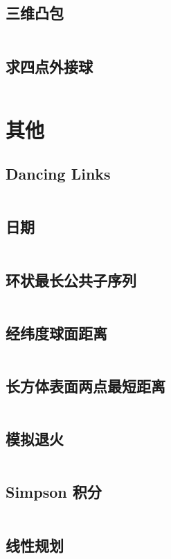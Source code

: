 \documentclass[a4paper,9]{article}
\begin{document}
\subsection{三维凸包}
\inputminted[breaklines,breakanywhere]{c++}{source/geometry/3d-convex.cpp}
\subsection{求四点外接球}
\inputminted[breaklines]{c++}{source/geometry/ball.cpp}

\section{其他}
\subsection{Dancing Links}
\inputminted[breaklines]{c++}{source/others/dancing-links.cpp}
\subsection{日期}
\inputminted[breaklines]{c++}{source/others/date.cpp}
\subsection{环状最长公共子序列}
\inputminted[breaklines]{c++}{source/others/cycle-longest.cpp}
\subsection{经纬度球面距离}
\inputminted[breaklines]{c++}{source/others/sphere.cpp}
\subsection{长方体表面两点最短距离}
\inputminted[breaklines]{c++}{source/others/rectangle.cpp}
\subsection{模拟退火}
\inputminted[breaklines]{c++}{source/others/simulate-anneal.cpp}
\subsection{Simpson 积分}
\inputminted[breaklines]{c++}{source/others/simpson.cpp}
\subsection{线性规划}
\inputminted[breaklines]{c++}{source/others/linear-programming.cpp}
\end{document}
